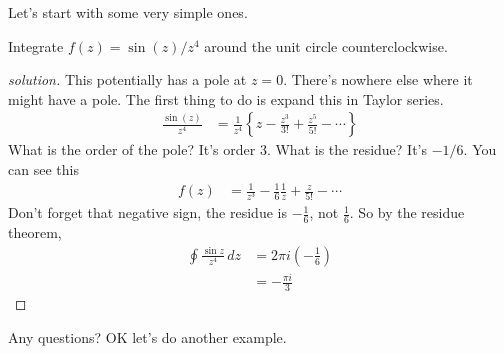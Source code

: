 Let's start with some very simple ones.
\begin{example}
    Integrate $f(z) = \sin(z)/z^4$ around the unit circle counterclockwise.
\end{example}
\begin{proof}[solution]
    This potentially has a pole at $z=0$.
    There's nowhere else where it might have a pole.
    The first thing to do is expand this in Taylor series.
    \begin{align}
        \frac{\sin(z)}{z^4} &=
        \frac{1}{z^4}\left\{
            z
            - \frac{z^3}{3!}
            + \frac{z^5}{5!}
            - \cdots
        \right\}
    \end{align}
    What is the order of the pole?
    It's order 3.
    What is the residue?
    It's $-1/6$.
    You can see this
    \begin{align}
        f(z) &=
        \frac{1}{z^3}
        - \frac{1}{6} \frac{1}{z}
        + \frac{z}{5!} - \cdots
    \end{align}
    Don't forget that negative sign,
    the residue is $-\frac{1}{6}$,
    not $\frac{1}{6}$.
    So by the residue theorem,
    \begin{align}
        \oint \frac{\sin z}{z^4}\,dz &=
        2\pi i \left( -\frac{1}{6} \right)\\
        &= -\frac{\pi i}{3}
    \end{align}
\end{proof}
Any questions?
OK let's do another example.


